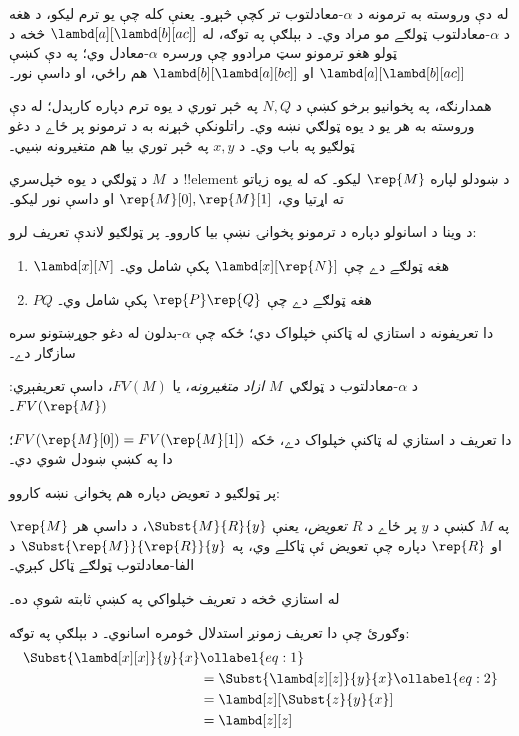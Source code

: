 \documentclass[../../../include/open-logic-section]{subfiles}
\begin{document}

له دې وروسته به ترمونه د $\alpha$-معادلتوب تر کچې څېړو۔ يعنې کله
چې يو ترم ليکو، د هغه د $\alpha$-معادلتوب ټولګے مو مراد وي۔
د بېلګې په توګه، له $\lambd[a][\lambd[b][a c]]$ څخه د ټولو هغو
ترمونو سټ مرادوو چې ورسره $\alpha$-معادل وي؛ په دې کښې
$\lambd[a][\lambd[b][a
    c]]$ او $\lambd[b][\lambd[a][b c]]$ هم راځي، او داسې نور۔

همدارنګه، په پخوانيو برخو کښې د $N, Q$ په څېر توري د يوه ترم
دپاره کارېدل؛ له دې وروسته به هر يو د يوه ټولګي نښه وي۔
راتلونکې څېړنه به د ترمونو پر ځاے د دغو ټولګيو په باب وي۔
د $x, y$ په څېر توري بيا هم متغيرونه ښيي۔

د~$M$ د ټولګي د يوه خپل‌سري !!{element} د ښودلو لپاره
$\rep{M}$ ليکو۔ که له يوه زياتو ته اړتيا وي،
$\rep{M}[0], \rep{M}[1]$ او داسې نور ليکو۔

د وينا د اسانولو دپاره د ترمونو پخوانۍ نښې بيا کاروو۔ پر
ټولګيو لاندې تعريف لرو:
\begin{defn}
  \begin{enumerate}
  \item $\lambd[x][N]$ هغه ټولګے دے چې
    $\lambd[x][\rep{N}]$ پکې شامل وي۔
  \item $PQ$ هغه ټولګے دے چې $\rep{P}\rep{Q}$ پکې شامل وي۔
  \end{enumerate}
\end{defn}

دا تعريفونه د استازي له ټاکنې خپلواک دي؛ ځکه چې
$\alpha$-بدلون له دغو جوړښتونو سره سازګار دے۔

\begin{defn} 
  د $\alpha$-معادلتوب د ټولګي~$M$ \emph{ازاد متغيرونه}، يا
  $FV(M)$، داسې تعريفېږي: $FV(\rep{M})$۔
\end{defn}

دا تعريف د استازي له ټاکنې خپلواک دے، ځکه
$FV(\rep{M}[0]) =
FV(\rep{M}[1])$؛ دا په  کښې ښودل شوي دي۔

پر ټولګيو د تعويض دپاره هم پخوانۍ نښه کاروو:
\begin{defn} 
  په $M$ کښې د $y$ پر ځاے د $R$ \emph{تعويض}، يعنې
  $\Subst{M}{R}{y}$، د داسې هر $\rep{M}$ او $\rep{R}$
  دپاره چې تعويض ئې ټاکلے وي، په
  $\Subst{\rep{M}}{\rep{R}}{y}$ د الفا-معادلتوب ټولګے ټاکل کېږي۔
\end{defn}

له استازي څخه د تعريف خپلواکي په  کښې ثابته شوې ده۔

وګورئ چې دا تعريف زمونږ استدلال څومره اسانوي۔ د بېلګې په توګه:
\begin{align}
  \Subst{\lambd[x][x]}{y}{x} & \ollabel{eq:1}\\
  &= \Subst{\lambd[z][z]}{y}{x} \ollabel{eq:2}\\
  &= \lambd[z][\Subst{z}{y}{x}] \\
  &= \lambd[z][z]
\end{align}
\end{document}

